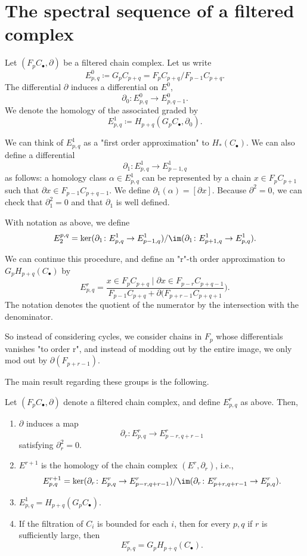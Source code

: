 \documentclass[ma3408.tex]{subfiles}
\begin{document}
\section{The spectral sequence of a filtered complex}
\begin{Def}
Let $(F_pC_{\bullet},\partial)$ be a filtered chain complex. Let us write
\[
E^0_{p,q} \coloneqq G_pC_{p+q} = F_pC_{p+q}/F_{p-1}C_{p+q}.
\]
The differential $\partial$ induces a differential on $E^0$,
\[
\partial_0 \colon E^0_{p,q} \to E^0_{p,q-1}.
\]
We denote the homology of the associated graded by
\[
E^1_{p,q} \coloneqq H_{p+q}(G_pC_{\bullet},\partial_0).
\]
\end{Def}
\begin{Rem}
We can think of $E^1_{p,q}$ as a "first order approximation" to $H_*(C_{\bullet})$. We can also define a differential
\[
\partial_1 \colon E^1_{p,q} \to E^1_{p-1,q}
\]
as follows: a homology class $\alpha \in E^1_{p,q}$ can be represented by a chain $x \in F_pC_{p+1}$ such that $\partial x \in F_{p-1}C_{p+q-1}$. We define $\partial_1(\alpha) = [\partial x]$. Because $\partial^2 = 0$, we can check that $\partial_1^2 = 0$ and that $\partial_1$ is well defined. 
\end{Rem}
\begin{Def}
With notation as above, we define
\[
E_2^{p,q} = \ker(\partial_1 \colon E^1_{p,q} \to E^1_{p-1,q})/\im(\partial_1 \colon E^1_{p+1,q} \to E^1_{p,q}). 
\]
\end{Def}
\begin{Rem}
We can continue this procedure, and define an "r"-th order approximation to $G_pH_{p+q}(C_{\bullet})$ by
\[
E^r_{p,q} = \frac{x \in F_pC_{p+q} \mid \partial x \in F_{p-r}C_{p+q-1}}{F_{p-1}C_{p+q} + \partial(F_{p+r-1}C_{p+q+1}}).
\]
The notation denotes the quotient of the numerator by the intersection with the denominator. 

So instead of considering cycles, we consider chains in $F_p$ whose differentials vanishes "to order r", and instead of modding out by the entire image, we only mod out by $\partial(F_{p+r-1})$. 
\end{Rem}
The main result regarding these groups is the following. 
\begin{Lem}\label{lem:ss_filtered_complex}
Let $(F_pC_{\bullet},\partial)$ denote a filtered chain complex, and define $E^r_{p,q}$ as above. Then,
\begin{enumerate}
	\item $\partial$ induces a map 
	\[
\partial_r \colon E^r_{p,q} \to E^r_{p-r,q+r-1}
	\]
	satisfying $\partial_r^2 = 0$. 
	\item $E^{r+1}$ is the homology of the chain complex $(E^r,\partial_r)$, i.e., 
	\[
E^{r+1}_{p,q} = \ker(\partial_r \colon E^r_{p,q} \to E^r_{p-r,q+r-1})/\im(\partial_r \colon E^r_{p+r,q+r-1} \to E^r_{p,q}). 
	\]
	\item $E^1_{p,q} = H_{p+q}(G_pC_{\bullet})$.
	\item If the filtration of $C_i$ is bounded for each $i$, then for every $p,q$ if $r$ is sufficiently large, then 
	\[
E^r_{p,q} = G_pH_{p+q}(C_{\bullet}). 
	\]
\end{enumerate}
\end{Lem}
\end{document}
